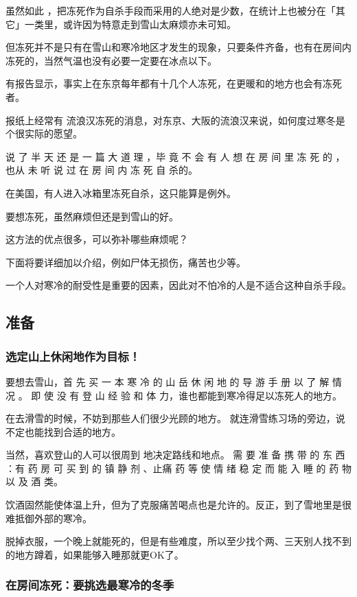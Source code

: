 \documentclass[UTF8]{ctexart}
\begin{document}
虽然如此 ，把冻死作为自杀手段而采用的人绝对是少数，在统计上也被分在「其它」一类里，或许因为特意走到雪山太麻烦亦未可知。

但冻死并不是只有在雪山和寒冷地区才发生的现象，只要条件齐备，也有在房间内冻死的，当然气温也没有必要一定要在冰点以下。

有报告显示，事实上在东京每年都有十几个人冻死，在更暖和的地方也会有冻死者。

报纸上经常有 流浪汉冻死的消息，对东京、大阪的流浪汉来说，如何度过寒冬是个很实际的愿望。

说 了 半 天 还 是 一 篇 大 道 理 ，毕 竟 不 会 有 人 想 在 房 间 里 冻 死 的 ，也从 未 听 说 过 在 房 间 内 冻 死 自 杀的。

在美国，有人进入冰箱里冻死自杀，这只能算是例外。

要想冻死，虽然麻烦但还是到雪山的好。

这方法的优点很多，可以弥补哪些麻烦呢？

下面将要详细加以介绍，例如尸体无损伤，痛苦也少等。

一个人对寒冷的耐受性是重要的因素，因此对不怕冷的人是不适合这种自杀手段。


\subsection{准备}

\subsubsection*{选定山上休闲地作为目标！}

要想去雪山，首 先 买 一 本 寒 冷 的 山 岳 休 闲 地 的 导 游 手 册 以 了 解 情 况 。
即 使 没 有 登 山 经 验 和 体 力，谁也都能到寒冷得足以冻死人的地方。

在去滑雪的时候，不妨到那些人们很少光顾的地方。
就连滑雪练习场的旁边，说不定也能找到合适的地方。

当然，喜欢登山的人可以很周到 地决定路线和地点。 
需 要 准 备 携 带 的 东 西 ：有 药 房 可 买 到 的 镇 静 剂 、止痛 药 等 使 情 绪 稳 定 而 能 入 睡 的 药 物 以 及 酒 类。

饮酒固然能使体温上升，但为了克服痛苦喝点也是允许的。反正，到了雪地里是很难抵御外部的寒冷。

脱掉衣服，一个晚上就能死的，但是有些难度，所以至少找个两、三天别人找不到的地方蹲着，如果能够入睡那就更OK了。

\subsubsection*{在房间冻死：要挑选最寒冷的冬季}
\end{document}
